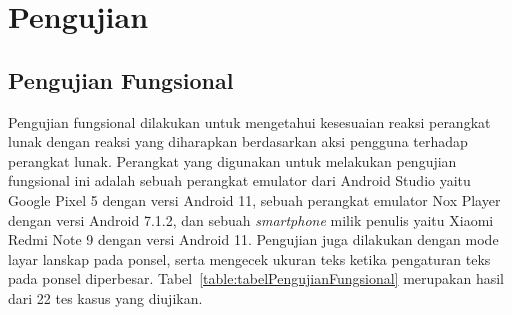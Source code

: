 \section{Pengujian}
\label{sec:pengujian}

\subsection{Pengujian Fungsional}
\label{subsec:pengujianFungsional}

Pengujian fungsional dilakukan untuk mengetahui kesesuaian reaksi perangkat lunak dengan reaksi yang diharapkan berdasarkan aksi pengguna terhadap perangkat lunak. Perangkat yang digunakan untuk melakukan pengujian fungsional ini adalah sebuah perangkat emulator dari Android Studio yaitu Google Pixel 5 dengan versi Android 11, sebuah perangkat emulator Nox Player dengan versi Android 7.1.2, dan sebuah \textit{smartphone} milik penulis yaitu Xiaomi Redmi Note 9 dengan versi Android 11. Pengujian juga dilakukan dengan mode layar lanskap pada ponsel, serta mengecek ukuran teks ketika pengaturan teks pada ponsel diperbesar. Tabel~\ref{table:tabelPengujianFungsional} merupakan hasil dari 22 tes kasus yang diujikan.


